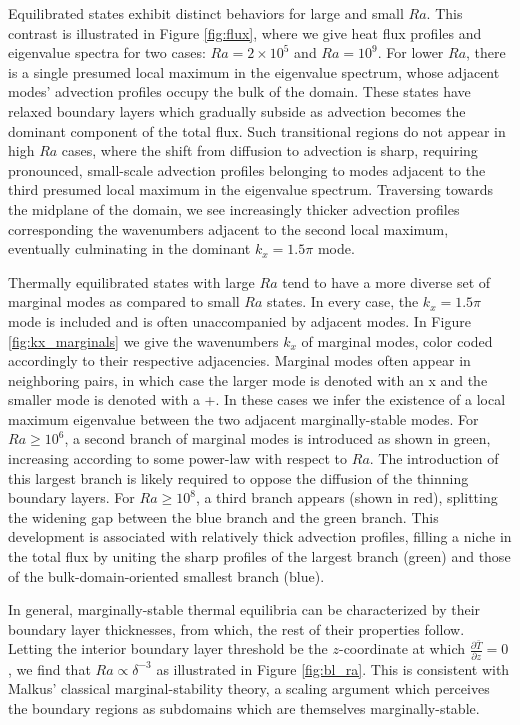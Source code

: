 \documentclass[reprint,amsmath,amssymb,aps]{revtex4-1}
\begin{document}
Equilibrated states exhibit distinct behaviors for large and small $Ra$. 
This contrast is illustrated in Figure \ref{fig:flux}, where we give heat flux profiles and eigenvalue spectra for two cases: $Ra = 2 \times 10^5$ and $Ra = 10^9$. 
For lower $Ra$, there is a single presumed local maximum in the eigenvalue spectrum, whose adjacent modes' advection profiles occupy the bulk of the domain. 
These states have relaxed boundary layers which gradually subside as advection becomes the dominant component of the total flux. 
Such transitional regions do not appear in high $Ra$ cases, where the shift from diffusion to advection is sharp, requiring pronounced, small-scale advection profiles belonging to modes adjacent to the third presumed local maximum in the eigenvalue spectrum. 
Traversing towards the midplane of the domain, we see increasingly thicker advection profiles corresponding the wavenumbers adjacent to the second local maximum, eventually culminating in the dominant $k_x = 1.5\pi$ mode.

Thermally equilibrated states with large $Ra$ tend to have a more diverse set of marginal modes as compared to small $Ra$ states. 
In every case, the $k_x = 1.5\pi$ mode is included and is often unaccompanied by adjacent modes. 
In Figure \ref{fig:kx_marginals} we give the wavenumbers $k_x$ of marginal modes, color coded accordingly to their respective adjacencies. 
Marginal modes often appear in neighboring pairs, in which case the larger mode is denoted with an x and the smaller mode is denoted with a +. 
In these cases we infer the existence of a local maximum eigenvalue between the two adjacent marginally-stable modes. 
For $Ra \geq 10^6$, a second branch of marginal modes is introduced as shown in green, increasing according to some power-law with respect to $Ra$. 
The introduction of this largest branch is likely required to oppose the diffusion of the thinning boundary layers. 
For $Ra \geq 10^8$, a third branch appears (shown in red), splitting the widening gap between the blue branch and the green branch. 
This development is associated with relatively thick advection profiles, filling a niche in the total flux by uniting the sharp profiles of the largest branch (green) and those of the bulk-domain-oriented smallest branch (blue).

In general, marginally-stable thermal equilibria can be characterized by their boundary layer thicknesses, from which, the rest of their properties follow. Letting the interior boundary layer threshold be the $z$-coordinate at which $\frac{\partial \bar{T}}{\partial z} = 0$, we find that $Ra \propto  \delta^{-3}$ as illustrated in Figure \ref{fig:bl_ra}. 
This is consistent with Malkus' classical marginal-stability theory, a scaling argument which perceives the boundary regions as subdomains which are themselves marginally-stable.
\end{document}
